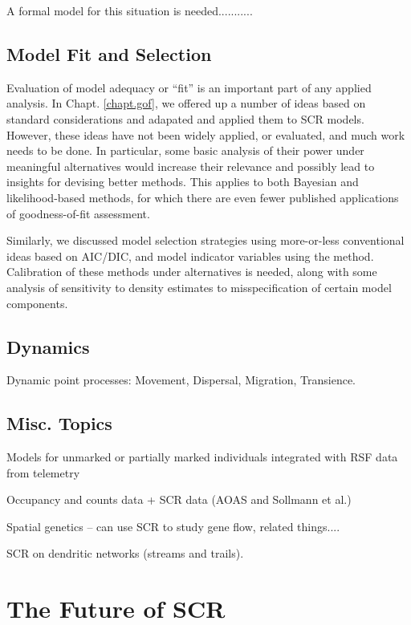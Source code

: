 \begin{table}[ht]
A formal model for this situation is needed...........




\subsection{Model Fit and Selection}

Evaluation of model adequacy or ``fit'' is an important part of any
applied analysis. In Chapt. \ref{chapt.gof}, we offered up a number of
ideas based on standard considerations and adapated and applied them
to SCR models.  However, these ideas have not been widely applied, or
evaluated, and much work needs to be done. In particular, some basic
analysis of their power under meaningful alternatives would increase
their relevance and possibly lead to insights for devising better
methods. This applies to both Bayesian and likelihood-based methods,
for which there are even fewer published applications of
goodness-of-fit assessment.

Similarly, we discussed model selection strategies using more-or-less
conventional ideas based on AIC/DIC, and model indicator variables
using the \citet{kuo_mallick:1998} method.  Calibration of these
methods under alternatives is needed, along with some analysis of
sensitivity to density estimates to misspecification of certain model
components.


\subsection{Dynamics}

Dynamic point processes:
Movement, Dispersal, Migration,
Transience.


\subsection{Misc. Topics}

Models for unmarked or partially marked individuals integrated with RSF data from telemetry

Occupancy and counts data + SCR data (AOAS and Sollmann et al.)

Spatial genetics  -- can use SCR to study gene flow, related things....

SCR on dendritic networks (streams and trails).


\section{The Future of SCR}


\end{table}
